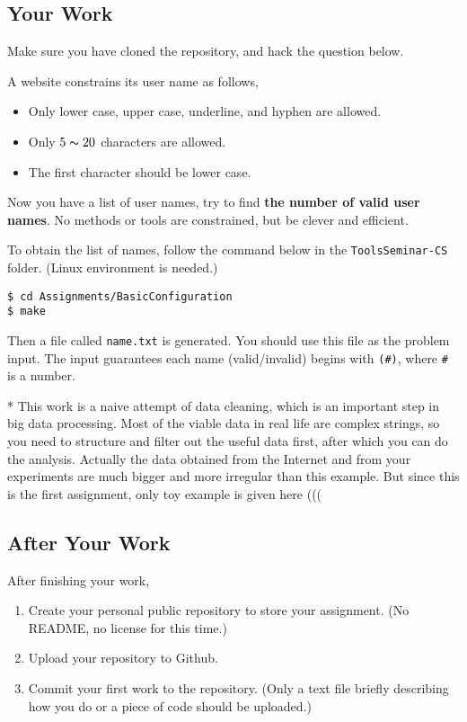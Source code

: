 \documentclass[english]{../TexTemplate/thesis}
\begin{document}
\subsection{Your Work}
Make sure you have cloned the repository, and hack the question below.

\bigskip
\begin{question}[Username]\normalfont
A website constrains its user name as follows,
\begin{itemize}
	\item Only lower case, upper case, underline, and hyphen are allowed.
	\item Only $5\thicksim 20$ characters are allowed.
	\item The first character should be lower case.
\end{itemize}
Now you have a list of user names, try to find \textbf{the number of valid user names}.
No methods or tools are constrained, but be clever and efficient.

To obtain the list of names, follow the command below in the \verb'ToolsSeminar-CS' folder.
(Linux environment is needed.)
\begin{lstlisting}
$ cd Assignments/BasicConfiguration
$ make
\end{lstlisting}
Then a file called \verb'name.txt' is generated.
You should use this file as the problem input.
The input guarantees each name (valid/invalid) begins with \verb'(#)', where \verb'#' is a number.
\end{question}

* This work is a naive attempt of data cleaning, which is an important step in big data processing.
Most of the viable data in real life are complex strings, so you need to structure and filter out the useful data first, after which you can do the analysis.
Actually the data obtained from the Internet and from your experiments are much bigger and more irregular than this example.
But since this is the first assignment, only toy example is given here (((

\subsection{After Your Work}
After finishing your work,
\begin{enumerate}
\item Create your personal public repository to store your assignment.
(No README, no license for this time.)
\item Upload your repository to Github.
\item Commit your first work to the repository.
(Only a text file briefly describing how you do or a piece of code should be uploaded.)
\end{enumerate}
\end{document}
